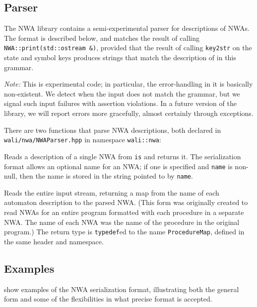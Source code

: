 \subsection{Parser}
\label{Se:parser}

The NWA library contains a semi-experimental parser for descriptions of
NWAs. The format is described below, and matches the result of calling
\texttt{NWA::print(std::ostream \&)}, provided that the result of
calling \texttt{key2str} on the state and symbol keys produces strings
that match the description of  in this grammar.

\emph{Note:} This is experimental code; in particular, the
error-handling in it is basically non-existent. We detect when the
input does not match the grammar, but we signal such input failures
with assertion violations. In a future version of the library, we will
report errors more gracefully, almost certainly through exceptions.

There are two functions that parse NWA descriptions, both declared in
\texttt{wali/nwa/NWAParser.hpp} in namespace \texttt{wali::nwa}:
\begin{functionlist}
  \functionitem[\texttt{NWARefPtr read\_nwa(std::istream \& is, std::string *
      name = NULL)}] Reads a description of a single NWA from \texttt{is} and
  returns it. The serialization format allows an optional name for an NWA; if
  one is specified and \texttt{name} is non-null, then the name is stored in
  the string pointed to by \texttt{name}.

   Reads the entire input stream,
  returning a map from the name of each automaton description to the parsed
  NWA. (This form was originally created to read NWAs for an entire program
  formatted with each procedure in a separate NWA. The name of each NWA was
  the name of the procedure in the original program.) The return type
  is \texttt{typedef}ed to the name \texttt{ProcedureMap},
  defined in the same header and namespace.
\end{functionlist}


\subsection{Examples}

 show examples of the NWA serialization format, illustrating
both the general form and some of the flexibilities in what precise
format is accepted.

